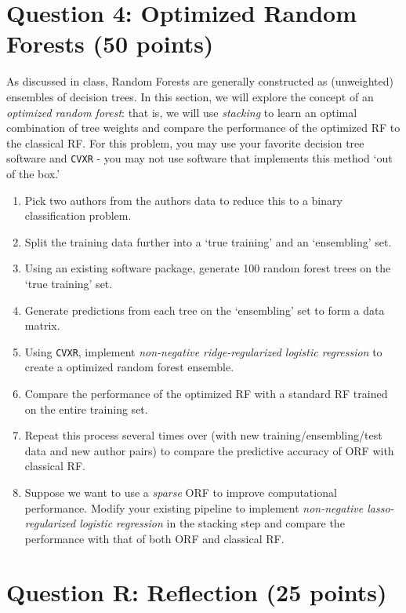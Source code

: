 \documentclass[10pt]{article}
\begin{document}
\section*{Question 4: Optimized Random Forests (50 points)}

As discussed in class, Random Forests are generally constructed as (unweighted) ensembles of decision trees. In this section, we will explore the concept of an \emph{optimized random forest}: that is, we will use \emph{stacking} to learn an optimal combination of tree weights and compare the performance of the optimized RF to the classical RF. For this problem, you may use your favorite decision tree software and \texttt{CVXR} - you may not use software that implements this method `out of the box.'

\begin{enumerate}
    \item Pick two authors from the \textsf{authors} data to reduce this to a binary classification problem. 
    \item Split the training data further into a `true training' and an `ensembling' set. 
    \item Using an existing software package, generate 100 random forest trees on the `true training' set.
    \item Generate predictions from each tree on the `ensembling' set to form a data matrix. 
    \item Using \texttt{CVXR}, implement \emph{non-negative ridge-regularized logistic regression} to create a optimized random forest ensemble.
    \item Compare the performance of the optimized RF with a standard RF trained on the entire training set. 
    \item Repeat this process several times over (with new training/ensembling/test data and new author pairs) to compare the predictive accuracy of ORF with classical RF. 
    \item Suppose we want to use a \emph{sparse} ORF to improve computational performance. Modify your existing pipeline to implement \emph{non-negative lasso-regularized logistic regression} in the stacking step and compare the performance with that of both ORF and classical RF.
\end{enumerate}

\section*{Question R: Reflection (25 points)}
\end{document}
